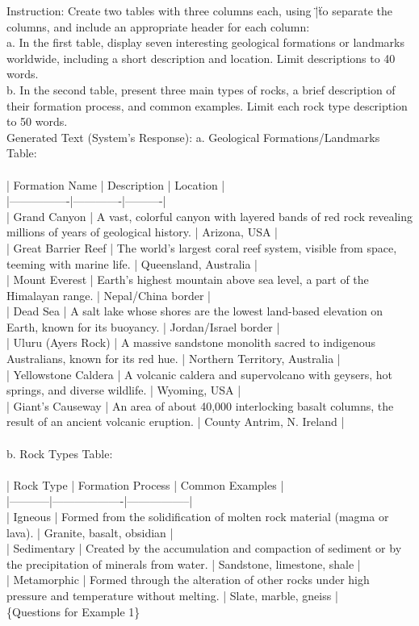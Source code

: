\begin{tcolorbox}[title=Example 1,breakable]
Instruction: Create two tables with three columns each, using \"|\" to separate the columns, and include an appropriate header for each column:\\a. In the first table, display seven interesting geological formations or landmarks worldwide, including a short description and location. Limit descriptions to 40 words.\\b. In the second table, present three main types of rocks, a brief description of their formation process, and common examples. Limit each rock type description to 50 words.\\Generated Text (System's Response): a. Geological Formations/Landmarks Table:\\\\| Formation Name | Description | Location |\\|----------------|-------------|----------|\\| Grand Canyon | A vast, colorful canyon with layered bands of red rock revealing millions of years of geological history. | Arizona, USA |\\| Great Barrier Reef | The world's largest coral reef system, visible from space, teeming with marine life. | Queensland, Australia |\\| Mount Everest | Earth's highest mountain above sea level, a part of the Himalayan range. | Nepal/China border |\\| Dead Sea | A salt lake whose shores are the lowest land-based elevation on Earth, known for its buoyancy. | Jordan/Israel border |\\| Uluru (Ayers Rock) | A massive sandstone monolith sacred to indigenous Australians, known for its red hue. | Northern Territory, Australia |\\| Yellowstone Caldera | A volcanic caldera and supervolcano with geysers, hot springs, and diverse wildlife. | Wyoming, USA |\\| Giant's Causeway | An area of about 40,000 interlocking basalt columns, the result of an ancient volcanic eruption. | County Antrim, N. Ireland |\\\\b. Rock Types Table:\\\\| Rock Type | Formation Process | Common Examples |\\|-----------|-------------------|-----------------|\\| Igneous | Formed from the solidification of molten rock material (magma or lava). | Granite, basalt, obsidian |\\| Sedimentary | Created by the accumulation and compaction of sediment or by the precipitation of minerals from water. | Sandstone, limestone, shale |\\| Metamorphic | Formed through the alteration of other rocks under high pressure and temperature without melting. | Slate, marble, gneiss |\\
\{Questions for Example 1\}
\end{tcolorbox}

